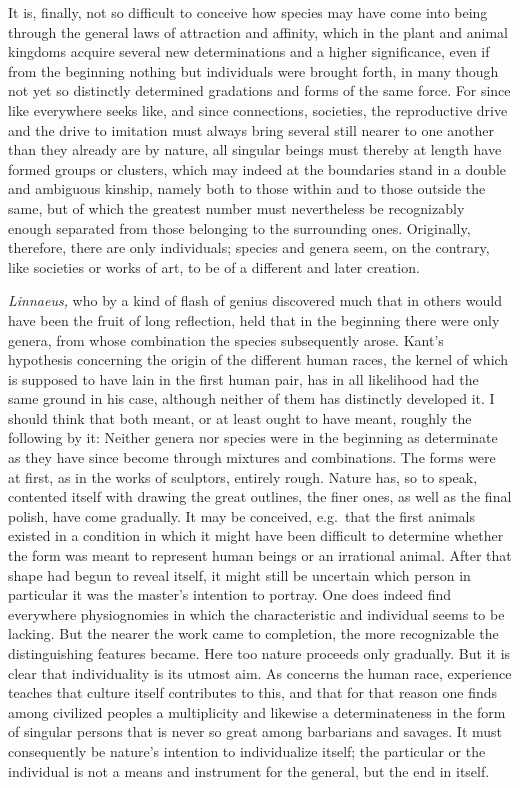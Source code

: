 \documentclass[12pt,a4paper,openany]{book}
\newcommand{\opage}[1]{\marginnote{\footnotesize\textit{[#1]}}}
\begin{document}
It is, finally, not so difficult to conceive how species may have come into being
through the general laws of attraction and affinity, which in the plant and animal
kingdoms acquire several new determinations and a higher significance, even if from
the beginning nothing but individuals were brought forth, in many though not yet so
distinctly determined gradations and forms of the same force. For since like
everywhere seeks like, and since connections, societies, the reproductive drive and
the drive to imitation must always bring several still nearer to one another than
they already are by nature, all singular beings must thereby at length have formed
groups or clusters, which may indeed at the
\setcounter{footnote}{0}%
\opage{106}boundaries stand in a double and ambiguous kinship, namely both to those within
and to those outside the same, but of which the greatest number must nevertheless be
recognizably enough separated from those belonging to the surrounding ones.
Originally, therefore, there are only individuals; species and genera seem, on the
contrary, like societies or works of art, to be of a different and later creation.

\textit{Linnaeus,} who by a kind of flash of genius discovered much that in others
would have been the fruit of long reflection, held that in the beginning there were
only genera, from whose combination the species subsequently arose. Kant's
hypothesis concerning the origin of the different human races, the kernel of which
is supposed to have lain in the first human pair, has in all likelihood had the
same ground in his case, although neither of them has distinctly developed it. I
should think that both meant, or at least ought to have meant, roughly the following
by it: Neither genera nor species were in the beginning as determinate as they have
since become through mixtures and combinations. The forms were at first, as in the
works of sculptors, entirely rough. Nature has, so to speak, contented itself with
drawing the great outlines, the finer ones, as well as the final polish, have come
gradually. It may be conceived, e.g.\ that the first animals existed in a condition
in which it might have been difficult to determine whether the form was meant to
represent human beings or an irrational animal. After that shape had begun to reveal
itself, it might still be uncertain which person in particular it was the master's
intention to portray. One does indeed find everywhere physiognomies in which the
characteristic and individual seems to be lacking. But the nearer the work came to
completion, the more recognizable the distinguishing features became. Here too
nature proceeds only gradually. But it is clear that individuality is its utmost
aim. As concerns the human race, experience teaches that culture itself contributes
to this, and that for that reason one finds among civilized peoples a
\setcounter{footnote}{0}%
\opage{107}multiplicity and likewise a determinateness in the form of singular persons that
is never so great among barbarians and savages. It must consequently be nature's
intention to individualize itself; the particular or the individual is not a means
and instrument for the general, but the end in itself.
\end{document}
